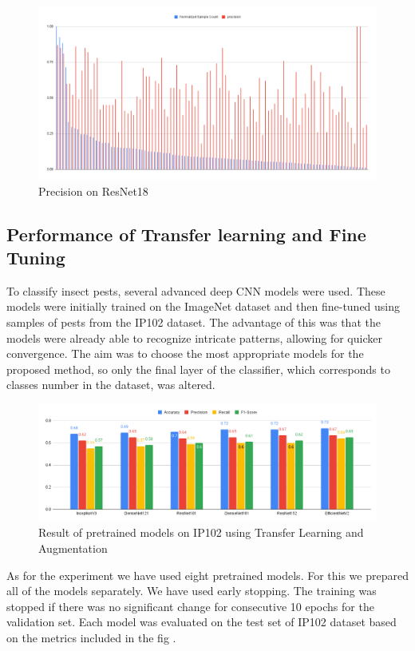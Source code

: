 \begin{figure}
    \centering
    \includegraphics[scale=.5]{figures/chart (2).png}
    \caption{Precision on ResNet18}
    \label{fig:rn18}
\end{figure}


\subsection{Performance of Transfer learning and Fine Tuning}
To classify insect pests, several advanced deep CNN models were used. These models were initially trained on the ImageNet dataset and then fine-tuned using samples of pests from the IP102 dataset. The advantage of this was that the models were already able to recognize intricate patterns, allowing for quicker convergence. The aim was to choose the most appropriate models for the proposed method, so only the final layer of the classifier, which corresponds to classes number in the dataset, was altered.
\begin{figure}
    \centering
    \includegraphics[scale=.7]{figures/chart (3).png}
    \caption{Result of pretrained models on IP102 using Transfer Learning and Augmentation}
    \label{fig:transfer_learning}
\end{figure}


As for the experiment we have used eight pretrained models. For this we prepared all of the models separately. We have used early stopping. The training was stopped if there was no significant change for consecutive 10 epochs for the validation set. Each model was evaluated on the test set of IP102 dataset based on the metrics included in the fig \pageref{fig:transfer_learning}.

